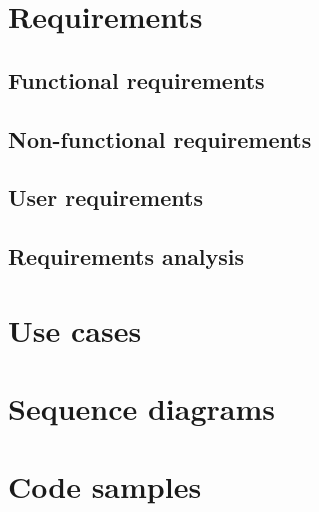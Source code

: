 \section{Requirements}

\subsection{Functional requirements}

\subsection{Non-functional requirements}

\subsection{User requirements}

\subsection{Requirements analysis}

\section{Use cases}

\section{Sequence diagrams}

\section{Code samples}
